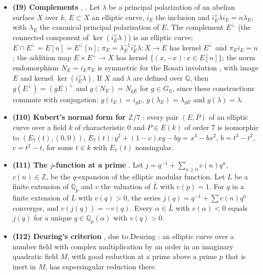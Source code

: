 \documentclass[11pt]{article}
\newcommand{\Q}{\mathbb Q}
\newcommand{\Z}{\mathbb Z}
\begin{document}
\begin{itemize}
\item \textbf{(I9) Complements} \cite[Section~5.3]{BL}, \cite[proof of Lemma~3]{P45}. Let \(\lambda\) be a principal
polarization of an abelian surface \(X\) over \(k\), \(E\subset X\) an elliptic curve, \(i_E\) the inclusion and
\(i_E^\vee\lambda i_E=n\lambda_E\), with \(\lambda_E\) the canonical principal polarization of \(E\). The complement
\(E^\perp\) (the connected component of \(\ker(i_E^\vee\lambda)\)) is an elliptic curve; \(E\cap E^\perp=E[n]=
E^\perp[n]\); \(\pi_E=\lambda_E^{-1}i_E^\vee\lambda:X\to E\) has kernel \(E^\perp\) and \(\pi_Ei_E=n\); the addition
map \(E\times E^\perp\to X\) has kernel \(\{(x,-x):x\in E[n]\}\); the norm endomorphism \(N_E=i_E\pi_E\) is symmetric
for the Rosati involution \cite[Lemma~5.3.1]{BL}, with image \(E\) and kernel \(\ker(i_E^\vee\lambda)\). If \(X\)
and \(\lambda\) are defined over \(\Q\), then \(g(E^\perp)=(gE)^\perp\) and \(g(N_E)=N_{gE}\) for \(g\in G_{\Q}\),
since these constructions commute with conjugation: \(g(i_E)=i_{gE}\), \(g(\lambda_E)=\lambda_{gE}\) and
\(g(\lambda)=\lambda\).

\item \textbf{(I10) Kubert's normal form for \(\Z/7\)} \cite[Table~3]{Ku}: every pair \((E,P)\) of an elliptic curve
over a field \(k\) of characteristic \(0\) and \(P\in E(k)\) of order \(7\) is isomorphic to \((E_7(t),(0,0))\),
\(E_7(t):y^2+(1-c)xy-by=x^3-bx^2\), \(b=t^3-t^2\), \(c=t^2-t\), for some \(t\in k\) with \(E_7(t)\) nonsingular.

\item \textbf{(I11) The \(j\)-function at a prime} \cite[Theorem~V.3.1(b) and Lemma~V.5.1]{Si}. Let
\(j=q^{-1}+\sum_{n\ge0}c(n)q^n\), \(c(n)\in\Z\), be the \(q\)-expansion of the elliptic modular function. Let \(L\) be
a finite extension of \(\Q_p\) and \(v\) the valuation of \(\bar L\) with \(v(p)=1\). For \(q\) in a finite extension
of \(L\) with \(v(q)>0\), the series \(j(q)=q^{-1}+\sum c(n)q^n\) converges, and \(v(j(q))=-v(q)\). Every
\(\alpha\in\bar L\) with \(v(\alpha)<0\) equals \(j(q)\) for a unique \(q\in\Q_p(\alpha)\) with \(v(q)>0\).

\item \textbf{(I12) Deuring's criterion} \cite[Chapter~13, Theorem~12]{La}, due to Deuring \cite{De}: an elliptic
curve over a number field with complex multiplication by an order in an imaginary quadratic field \(M\), with good
reduction at a prime above a prime \(p\) that is inert in \(M\), has supersingular reduction there.


\end{itemize}
\end{document}

